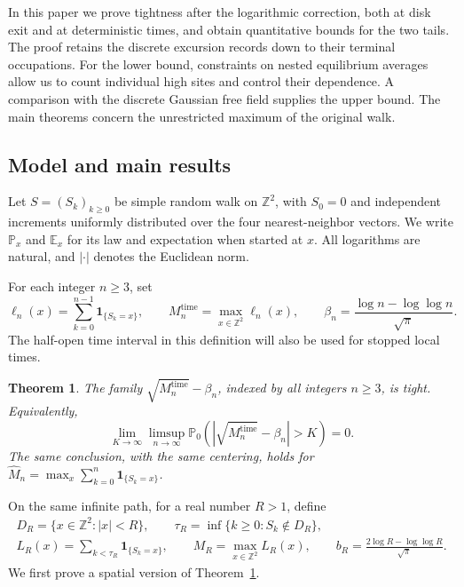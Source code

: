 \documentclass[11pt,letterpaper,reqno]{amsart}
\numberwithin{equation}{section}
\newtheorem{theorem}{Theorem}[section]
\theoremstyle{remark}
\begin{document}
In this paper we prove tightness after the logarithmic correction, both at disk exit and at deterministic times, and obtain quantitative bounds for the two tails. The proof retains the discrete excursion records down to their terminal occupations. For the lower bound, constraints on nested equilibrium averages allow us to count individual high sites and control their dependence. A comparison with the discrete Gaussian free field supplies the upper bound. The main theorems concern the unrestricted maximum of the original walk.

\subsection{Model and main results}\label{sec:results}
Let $S=(S_k)_{k\ge0}$ be simple random walk on $\mathbb Z^2$, with $S_0=0$ and independent increments uniformly distributed over the four nearest-neighbor vectors. We write $\mathbb P_x$ and $\mathbb E_x$ for its law and expectation when started at $x$. All logarithms are natural, and $|\cdot|$ denotes the Euclidean norm.

For each integer $n\ge3$, set
\begin{equation}\label{eq:1.1}
\ell_n(x)=\sum_{k=0}^{n-1}\mathbf1_{\{S_k=x\}},\qquad
M_n^{\mathrm{time}}=\max_{x\in\mathbb Z^2}\ell_n(x),\qquad
\beta_n=\frac{\log n-\log\log n}{\sqrt\pi}.
\end{equation}
The half-open time interval in this definition will also be used for stopped local times.

\begin{theorem}\label{thm:time}
The family $\sqrt{M_n^{\mathrm{time}}}-\beta_n$, indexed by all integers $n\ge3$, is tight. Equivalently,
\begin{equation}\label{eq:1.2}
\lim_{K\to\infty}\limsup_{n\to\infty}
\mathbb P_0\!\left(\left|\sqrt{M_n^{\mathrm{time}}}-\beta_n\right|>K\right)=0.
\end{equation}
The same conclusion, with the same centering, holds for
$\widehat M_n=\max_x\sum_{k=0}^{n}\mathbf1_{\{S_k=x\}}$.
\end{theorem}

On the same infinite path, for a real number $R>1$, define
\begin{equation}\label{eq:1.3}
\begin{gathered}
D_R=\{x\in\mathbb Z^2:|x|<R\},\qquad
\tau_R=\inf\{k\ge0:S_k\notin D_R\},\\
L_R(x)=\sum_{k<\tau_R}\mathbf1_{\{S_k=x\}},\qquad
M_R=\max_{x\in\mathbb Z^2}L_R(x),\qquad
b_R=\frac{2\log R-\log\log R}{\sqrt\pi}.
\end{gathered}
\end{equation}
We first prove a spatial version of Theorem~\ref{thm:time}.
\end{document}
